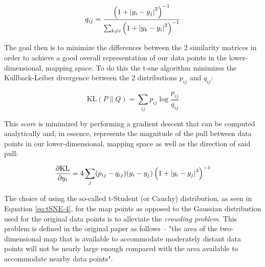 \begin{equation}
    q_{ij} = \frac{\left(1 + \left\lvert y_i - y_j\right\rvert^2\right)^{-1}}{\sum_{k \neq i}\left(1 + \left\lvert y_k - y_i\right\rvert^2\right)^{-1}}
\label{eq:tSNE-4}
\end{equation}

\noindent \newline The goal then is to minimize the differences between the 2 similarity matrices in order to achieve a good overall representation of our data points in the lower-dimensional, mapping space. To do this the \gls{t-sne} algorithm minimizes the Kullback-Leiber divergence between the 2 distributions $p_{ij}$ and $q_{ij}$:

\begin{equation}
    \text{KL}(P\|Q) = \sum_{ij} p_{ij} \log \frac{p_{ij}}{q_{ij}}
\label{eq:tSNE-5}
\end{equation}

\noindent \newline This \textit{score} is minimized by performing a gradient descent that can be computed analytically and, in essence, represents the magnitude of the pull between data points in our lower-dimensional, mapping space as well as the direction of said pull:

\begin{equation}
    \frac{\partial \text{KL}}{\partial y_i} = 4 \sum_j (p_{ij} - q_{ij})(y_i - y_j)\left(1 + \left\lvert y_i - y_j\right\rvert^2\right)^{-1}
\label{eq:tSNE-6}
\end{equation}

\noindent \newline The choice of using the so-called t-Student (or Cauchy) distribution, as seen in Equation \ref{eq:tSNE-4}, for the map points as opposed to the Gaussian distribution used for the original data points is to alleviate the \textit{crowding problem}. This problem is defined in the original paper as follows -- "the area of the two-dimensional map that is available to accommodate moderately distant data points will not be nearly large enough compared with the area available to accommodate nearby data points".

